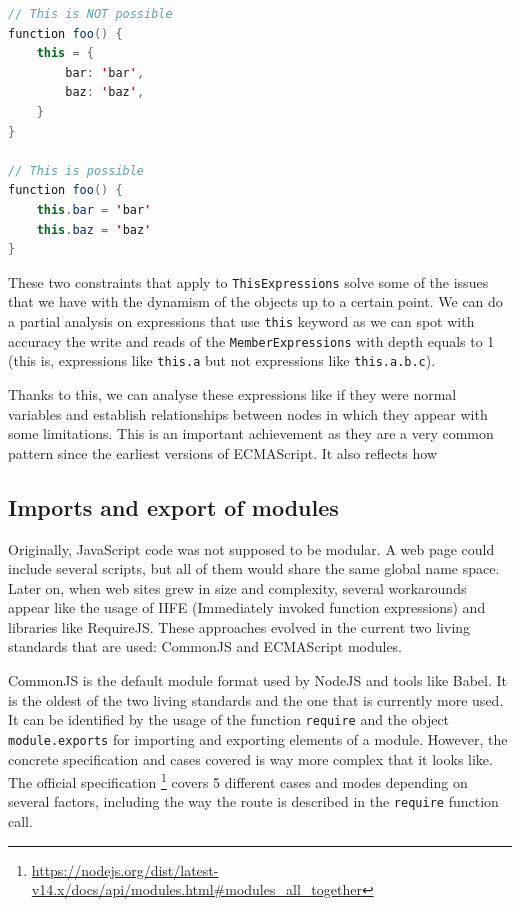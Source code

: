 \documentclass{uvamscse}
\begin{document}
\begin{lstlisting}[language=Java, caption=\texttt{this} not always behaves as an object]
// This is NOT possible
function foo() {
    this = {
        bar: 'bar',
        baz: 'baz',
    }
}

// This is possible
function foo() {
    this.bar = 'bar'
    this.baz = 'baz'
}
\end{lstlisting}

These two constraints that apply to \texttt{ThisExpressions} solve some of the issues that we have with the dynamism of the objects up to a certain point. We can do a partial analysis on expressions that use \texttt{this} keyword as we can spot with accuracy the write and reads of the \texttt{MemberExpressions} with depth equals to 1 (this is, expressions like \texttt{this.a} but not expressions like \texttt{this.a.b.c}).

Thanks to this, we can analyse these expressions like if they were normal variables and establish relationships between nodes in which they appear with some limitations. This is an important achievement as they are a very common pattern since the earliest versions of ECMAScript. It also reflects how

\subsection{Imports and export of modules}
Originally, JavaScript code was not supposed to be modular. A web page could include several scripts, but all of them would share the same global name space. Later on, when web sites grew in size and complexity, several workarounds appear like the usage of IIFE (Immediately invoked function expressions) and libraries like RequireJS. These approaches evolved in the current two living standards that are used: CommonJS and ECMAScript modules.

CommonJS is the default module format used by NodeJS and tools like Babel. It is the oldest of the two living standards and the one that is currently more used. It can be identified by the usage of the function \texttt{require} and the object \texttt{module.exports} for importing and exporting elements of a module. However, the concrete specification and cases covered is way more complex that it looks like. The official specification \footnote{\url{https://nodejs.org/dist/latest-v14.x/docs/api/modules.html\#modules_all_together}} covers 5 different cases and modes depending on several factors, including the way the route is described in the \texttt{require} function call.
\end{document}
